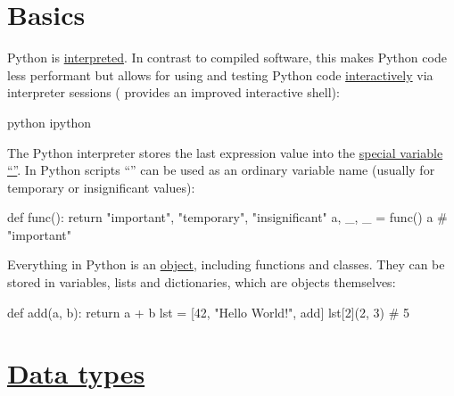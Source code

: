 \documentclass[rules]{cheatsheet}
\begin{document}
\section{Basics}

Python is \href{https://docs.python.org/3/glossary.html#term-interpreted}{interpreted}. In contrast to compiled software, this makes Python code less performant but allows for using and testing Python code \href{https://docs.python.org/3/glossary.html#term-interactive}{interactively} via interpreter sessions (\href{https://ipython.org/}{} provides an improved interactive shell):
\begin{bash}
  python
  ipython
\end{bash}

The Python interpreter stores the last expression value into the \href{https://dbader.org/blog/meaning-of-underscores-in-python#single-underscore}{special variable \enquote{{\pyinline{_}}}}. In Python scripts \enquote{{\pyinline{_}}} can be used as an ordinary variable name (usually for temporary or insignificant values):
\begin{python}
  def func():
    return "important", "temporary", "insignificant"
  a, _, _ = func()
  a # "important"
\end{python}

Everything in Python is an \href{https://docs.python.org/3/reference/datamodel.html#objects-values-and-types}{object}, including functions and classes. They can be stored in variables, lists and dictionaries, which are objects themselves:
\begin{python}
  def add(a, b):
    return a + b
  lst = [42, "Hello World!", add]
  lst[2](2, 3) # 5
\end{python}

\section{\href{https://docs.python.org/3/library/datatypes.html}{Data types}}
\end{document}
